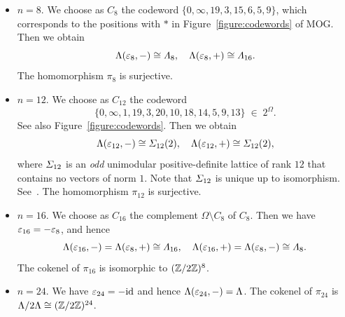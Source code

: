 \documentclass{amsart} %
\begin{document}
\begin{itemize}
%
\item $n=8$. 
We choose as $C_{8}$ the codeword 
$\{ 0,\infty, 19, 3, 15, 6, 5, 9\} $, 
which corresponds to 
the positions with $*$ in Figure~\ref{figure:codewords} of MOG.
Then we obtain 
\[
\Lambda(\varepsilon_8, -)\cong \varLambda_{8},
\quad 
\Lambda(\varepsilon_8, +)\cong \varLambda_{16}.
\]
The homomorphism $\pi_{8}$ is surjective.
%
\item $n=12$. 
We choose as $C_{12}$ the codeword 
\begin{equation}\label{eq:C12}
\{ 0,\infty, 1,19, 3, 20,10, 18, 14, 5, 9, 13\} \;\in\; 2^{\Omega}.
\end{equation}
See also Figure~\ref{figure:codewords}.
Then we obtain 
\[
\Lambda(\varepsilon_{12}, -)\cong \varSigma_{12}(2),
\quad 
\Lambda(\varepsilon_{12}, +)\cong \varSigma_{12}(2),
\]
where $\varSigma_{12}$ is an \emph{odd} unimodular positive-definite lattice of rank $12$
that contains no vectors of norm $1$.
Note that $\varSigma_{12}$ is unique up to isomorphism.
See~\cite[Table 16.7]{theCSbook}.
The homomorphism $\pi_{12}$ is surjective.
%
\item $n=16$. 
We choose as $C_{16}$ the complement $\Omega\setminus C_8$ of $C_8$. 
Then we have $\varepsilon_{16}=-\varepsilon_{8}$, and hence 
\[
\Lambda(\varepsilon_{16}, -)=\Lambda(\varepsilon_{8}, +)\cong \varLambda_{16},
\quad 
\Lambda(\varepsilon_{16}, +)=\Lambda(\varepsilon_8, -)\cong \varLambda_{8}.
\]
%
The cokenel of $\pi_{16}$ is isomorphic to $(\mathord{\mathbb{Z}}/2\mathord{\mathbb{Z}})^8$.
%
\item $n=24$. We have $\varepsilon_{24}=-\mathord{\mathrm{id}}$ and hence 
$\Lambda(\varepsilon_{24}, -)=\Lambda$.
The cokenel of $\pi_{24}$ is $\Lambda/2\Lambda \cong (\mathord{\mathbb{Z}}/2\mathord{\mathbb{Z}})^{24}$.
\end{itemize}
%
\end{document}
